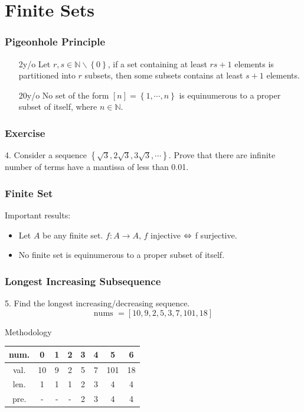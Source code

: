 \documentclass{beamer}
\begin{document}
\section{Finite Sets}
\begin{frame}
    \frametitle{Pigeonhole Principle}
    \vv 
    \begin{enumerate}
        \item[2y/o] Let $r,s \in \mathbb{N} \backslash\!\left\lbrace 0 \right\rbrace $, 
        if a set containing at least ${rs} + 1$ elements is partitioned into $r$ subsets, 
        then some subsets contains at least $s + 1$ elements.
        \item[20y/o] No set of the form $[n] = \left\lbrace 1, \cdots, n\right\rbrace$ 
        is equinumerous to a proper subset of itself, 
        where $n \in \mathbb{N}$.
	\end{enumerate}
\end{frame}
\begin{frame}
    \frametitle{Exercise}
    4. Consider a sequence $\left\lbrace \sqrt{3}, 2\sqrt{3}, 3\sqrt{3}, \cdots \right\rbrace$.
    Prove that there are infinite number of terms have a mantissa of less than 0.01.
    

\end{frame}
\begin{frame}
    \frametitle{Finite Set}
    Important results:
    \begin{itemize}
        \item Let $A$ be any finite set. 
        $f : A \to A$, $f$  injective $\Leftrightarrow$ f
        surjective.
        \item No finite set is equinumerous to a proper subset of itself.
    \end{itemize}
    \vv
\end{frame}
\begin{frame}
    \frametitle{Longest Increasing Subsequence}
    5. Find the longest increasing/decreasing sequence.
    $$\text{nums }= [10, 9, 2, 5, 3, 7, 101, 18]$$
    \begin{block}{Methodology}
        \begin{table}[]
            \begin{tabular}{||c|ccccccc||}
            \toprule
            num.&0  &1  &2  &3  &4  &5  &6  \\ 
            \midrule
            val.&10  &9  &2  &5  &7  &101  &18  \\ \hline
            len.&1  &1  &1  &2  &3  &4  &4  \\ \hline
            pre.&-  &-  &-  &2  &3  &4  &4  \\ 
            \bottomrule
            \end{tabular}
            \end{table}
    \end{block}
\end{frame}
\end{document}
